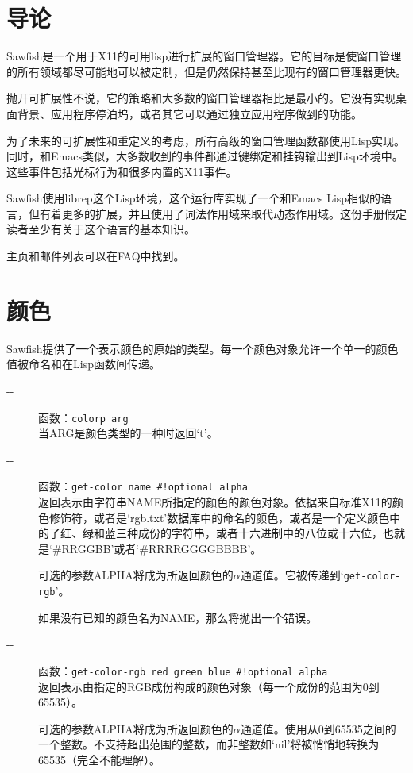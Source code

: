 \documentclass{book}
\begin{document}
\begin{CJK*}{UTF8}{gbsn}
\tableofcontents{}
\chapter{导论}
Sawfish是一个用于X11的可用lisp进行扩展的窗口管理器。它的目标是使窗口管理的所有领域都尽可能地可以被定制，但是仍然保持甚至比现有的窗口管理器更快。

抛开可扩展性不说，它的策略和大多数的窗口管理器相比是最小的。它没有实现桌面背景、应用程序停泊坞，或者其它可以通过独立应用程序做到的功能。

为了未来的可扩展性和重定义的考虑，所有高级的窗口管理函数都使用Lisp实现。同时，和Emacs类似，大多数收到的事件都通过键绑定和挂钩输出到Lisp环境中。这些事件包括光标行为和很多内置的X11事件。

Sawfish使用librep这个Lisp环境，这个运行库实现了一个和Emacs Lisp相似的语言，但有着更多的扩展，并且使用了词法作用域来取代动态作用域。这份手册假定读者至少有关于这个语言的基本知识。

主页和邮件列表可以在FAQ中找到。
\chapter{颜色}
Sawfish提供了一个表示颜色的原始的类型。每一个颜色对象允许一个单一的颜色值被命名和在Lisp函数间传递。
\begin{description}
\item[-{}-] 函数：\verb|colorp arg|\\
当ARG是颜色类型的一种时返回`t'。
\item[-{}-] 函数：\verb|get-color name #!optional alpha|\\
返回表示由字符串NAME所指定的颜色的颜色对象。依据来自标准X11的颜色修饰符，或者是`rgb.txt'数据库中的命名的颜色，或者是一个定义颜色中的了红、绿和蓝三种成份的字符串，或者十六进制中的八位或十六位，也就是`\#RRGGBB'或者`\#RRRRGGGGBBBB'。

可选的参数ALPHA将成为所返回颜色的$\alpha $通道值。它被传递到`\verb|get-color-rgb|'。

如果没有已知的颜色名为NAME，那么将抛出一个错误。
\item[-{}-] 函数：\verb|get-color-rgb red green blue #!optional alpha|\\
返回表示由指定的RGB成份构成的颜色对象（每一个成份的范围为0到65535）。

可选的参数ALPHA将成为所返回颜色的$\alpha $通道值。使用从0到65535之间的一个整数。不支持超出范围的整数，而非整数如`nil'将被悄悄地转换为65535（完全不能理解）。
\end{description}


\end{CJK*}
\end{document}
